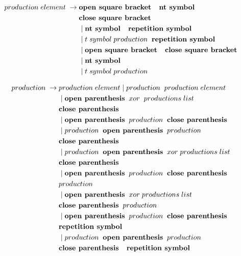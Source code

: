  

\begin{align*}
	production\;element\; \rightarrow\; & \textbf{open square bracket \; nt symbol} \\ 
			   &\textbf{close square bracket}\\
               &\mid \textbf{nt symbol \; repetition symbol} \\
               &\mid t\;symbol\;production\;\; \textbf{repetition symbol} \\
               &\mid \textbf{open square bracket \; close square bracket} \\
               &\mid \textbf{nt symbol} \\
               &\mid t\; symbol\; production 
\end{align*}

\begin{align*}
	production\; \rightarrow\; &production\; element
                \mid production\;\; production\; element \\
               &\mid \textbf{open parenthesis}\;\; xor\; \;productions\; list\;\; \\
               &\textbf{close parenthesis} \\
               &\mid \textbf{open parenthesis}\;\; production\;\; \textbf{close parenthesis} \\
               &\mid production \;\;\textbf{open parenthesis}\;\; production \\
               &\textbf{close parenthesis} \\
               &\mid production\;\; \textbf{open parenthesis} \;\;xor \;productions\; list\\
               &\textbf{close parenthesis} \\
               &\mid \textbf{open parenthesis} \;\;production \;\;\textbf{close parenthesis} \\
               &production \\
               &\mid \textbf{open parenthesis}\;\; xor\; productions\; list\\ 
               &\textbf{close parenthesis}\;\; production \\
               &\mid \textbf{open parenthesis}\;\; production\;\; \textbf{close parenthesis} \\
               &\textbf{repetition symbol}\\
               &\mid production\;\; \textbf{open parenthesis} \;\;production \\
               &\textbf{close parenthesis \; repetition symbol}
\end{align*}


